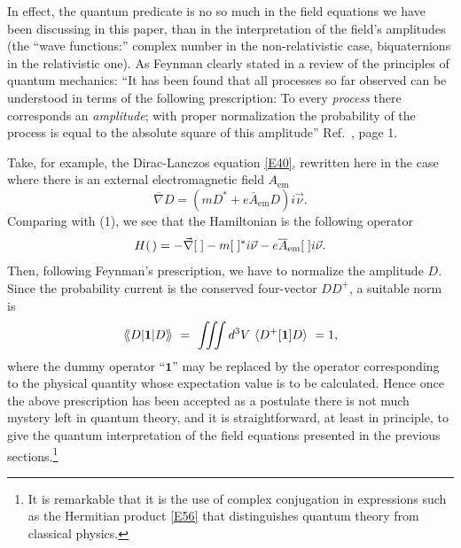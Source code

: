\documentclass [12pt,a4paper      ]{article}
\newcommand{\CON}{\overline}          %
\newcommand{\SCA}{\langle}            %
\newcommand{\LAR}{\rangle}            %
\newcommand{\BRA}{\langle\kern -.2em\langle} %
\newcommand{\KET}{\rangle\kern -.2em\rangle} %
\newcommand{\Q}{[\hspace{1.mm}]} %
\newcommand{\A}{(\hspace{.5mm})} %
\begin{document}
     In effect,  the quantum predicate is no so much in the field 
equations  we have been discussing in this paper,  than in 
the   interpretation  of  the  field's  amplitudes   (the   ``wave 
functions:''   complex   number  in  the  non-relativistic   case, 
biquaternions  in  the  relativistic one).   As  Feynman  clearly 
stated  in a review of the principles of quantum  mechanics:  ``It 
has  been  found  that  all processes  so  far  observed  can  be 
understood  in  terms  of the following  prescription:  To  every 
\emph{process} there corresponds an \emph{amplitude}; with proper 
normalization the probability of the process is equal to the absolute 
square of this amplitude'' Ref.~\cite{R44}, page 1.

     Take,   for  example,   the  Dirac-Lanczos  equation \eqref{E40}, 
rewritten   here  in  the  case  where  there  is   an   external 
electromagnetic field $A_{\text{em}}$
%
\begin{equation}\label{E54}  
        \CON{\nabla} D
               = (m D^* + e \CON{A}_{\text{em}} D) i \vec{\nu}.   %
\end{equation}
%
Comparing with (1),  we see that the Hamiltonian is the following 
operator
%
\begin{equation}\label{E55}
      H\A = -\vec{\nabla}\Q  - m\Q ^*i \vec{\nu}
            - e \CON{A}_{\text{em}}\Q i \vec{\nu}. %
\end{equation}
%
Then, following Feynman's prescription, we have to normalize the 
amplitude $D$.  Since the probability 
current is the conserved four-vector $DD^+$, a suitable norm is
%
\begin{equation}\label{E56}
 \BRA D |\mathbf{1}| D \KET ~ = ~ \iiint d^3V ~ \SCA D^+[\mathbf{1}]D \LAR ~ = 1, %
\end{equation}
%
where the dummy operator ``$\mathbf{1}$'' may be replaced by the
operator corresponding to the physical quantity whose  expectation value is 
to be calculated. Hence once the above prescription has been  accepted 
as  a postulate there is not much mystery left in quantum theory, 
and  it is straightforward,  at least in principle,  to give  the 
quantum  interpretation of the field equations presented  in  the 
previous sections.\footnote{It is remarkable that it is the use of complex conjugation in expressions such as the Hermitian product \eqref{E56} that distinguishes quantum theory from classical physics. }  
\end{document}
